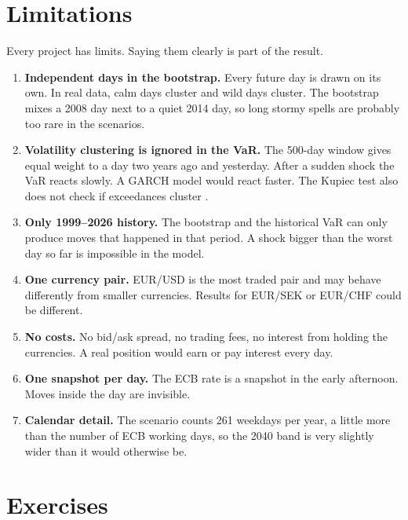 \documentclass[11pt,a4paper]{article}
\begin{document}
\section{Limitations}\label{sec:limits}

Every project has limits. Saying them clearly is part of the result.

\begin{enumerate}
  \item \textbf{Independent days in the bootstrap.} Every future day is
    drawn on its own. In real data, calm days cluster and wild days cluster.
    The bootstrap mixes a 2008 day next to a quiet 2014 day, so long stormy
    spells are probably too rare in the scenarios.
  \item \textbf{Volatility clustering is ignored in the VaR.} The 500-day
    window gives equal weight to a day two years ago and yesterday. After a
    sudden shock the VaR reacts slowly. A GARCH model
    \citep{bollerslev1986} would react faster. The Kupiec test also does not
    check if exceedances cluster \citep{christoffersen1998}.
  \item \textbf{Only 1999--2026 history.} The bootstrap and the historical
    VaR can only produce moves that happened in that period. A shock bigger
    than the worst day so far is impossible in the model.
  \item \textbf{One currency pair.} EUR/USD is the most traded pair and may
    behave differently from smaller currencies. Results for EUR/SEK or
    EUR/CHF could be different.
  \item \textbf{No costs.} No bid/ask spread, no trading fees, no interest
    from holding the currencies. A real position would earn or pay
    interest every day.
  \item \textbf{One snapshot per day.} The ECB rate is a snapshot in the
    early afternoon. Moves inside the day are invisible.
  \item \textbf{Calendar detail.} The scenario counts 261 weekdays per year,
    a little more than the number of ECB working days, so the 2040 band
    is very slightly wider than it would otherwise be.
\end{enumerate}

\section{Exercises}\label{sec:exercises}
\end{document}
